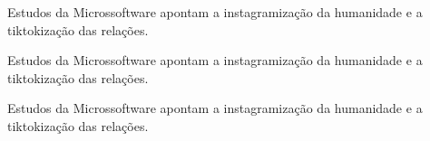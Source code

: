 \documentclass[a4paper]{article}
\begin{document}
\begin{minipage}{3.5cm}
Estudos da Microssoftware apontam a instagramização da humanidade e a
tiktokização das relações.
\end{minipage}

\clearpage

\begin{minipage}{3.5cm}
Estudos da Micros\-soft\-ware apontam a ins\-ta\-gra\-mi\-za\-ção da
humanidade e a tik\-to\-ki\-za\-ção das relações.
\end{minipage}

\clearpage


\begin{minipage}{3.5cm}
Estudos da Microssoftware apontam a instagramização da humanidade e a
tiktokização das relações.
\end{minipage}
\end{document}
